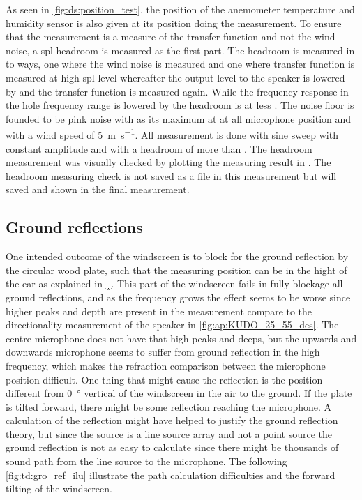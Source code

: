 
As seen in \autoref{fig:ds:position_test}, the position of the anemometer temperature and humidity sensor is also given at its position doing the measurement. To ensure that the measurement is a measure of the transfer function and not the wind noise, a \gls{spl} headroom is measured as the first part. The headroom is measured in to ways, one where the wind noise is measured and one where transfer function is measured at high \gls{spl} level whereafter the output level to the speaker is lowered by  and the transfer function is measured again. While the frequency response in the hole frequency range is lowered by  the headroom is at less . The noise floor is founded to be pink noise with  as its maximum at  at all microphone position and with a wind speed of \SI{5}{\meter\per\second}. All measurement is done with sine sweep with constant amplitude and with a headroom of more than . The headroom measurement was visually checked by plotting the measuring result in \matlab. The headroom measuring check is not saved as a file in this measurement but will saved and shown in the final measurement.



\subsection{Ground reflections}\label{sec:des:ground_reflection}
One intended outcome of the windscreen is to block for the ground reflection by the circular wood plate, such that the measuring position can be in the hight of the ear as explained in \autoref{}. This part of the windscreen fails in fully blockage all ground reflections, and as the frequency grows the effect seems to be worse since higher peaks and depth are present in the measurement compare to the directionality measurement of the speaker in \autoref{fig:ap:KUDO_25_55_des}. The centre microphone does not have that high peaks and deeps, but the upwards and downwards microphone seems to suffer from ground reflection in the high frequency, which makes the refraction comparison between the microphone position difficult. One thing that might cause the reflection is the position different from \SI{0}{\degree} vertical of the windscreen in the air to the ground. If the plate is tilted forward, there might be some reflection reaching the microphone. A calculation of the reflection might have helped to justify the ground reflection theory, but since the source is a line source array and not a point source the ground reflection is not as easy to calculate since there might be thousands of sound path from the line source to the microphone. The following \autoref{fig:td:gro_ref_ilu} illustrate the path calculation difficulties and the forward tilting of the windscreen. 

